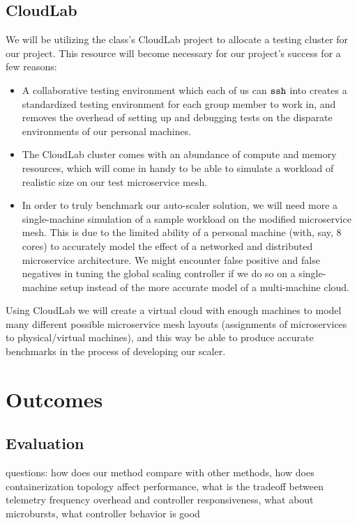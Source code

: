\documentclass{proposal}
\begin{document}
\subsection{CloudLab}
We will be utilizing the class's CloudLab project to allocate a testing cluster for our project. This resource will become necessary for our project's success for a few reasons:
\begin{itemize}
    \item A collaborative testing environment which each of us can $\tt ssh$ into creates a standardized testing environment for each group member to work in, and removes the overhead of setting up and debugging tests on the disparate environments of our personal machines.
    \item The CloudLab cluster comes with an abundance of compute and memory resources, which will come in handy to be able to simulate a workload of realistic size on our test microservice mesh.
    \item In order to truly benchmark our auto-scaler solution, we will need more a single-machine simulation of a sample workload on the modified microservice mesh. This is due to the limited ability of a personal machine (with, say, 8 cores) to accurately model the effect of a networked and distributed microservice architecture. We might encounter false positive and false negatives in tuning the global scaling controller if we do so on a single-machine setup instead of the more accurate model of a multi-machine cloud.
\end{itemize}
Using CloudLab we will create a virtual cloud with enough machines to model many different possible microservice mesh layouts (assignments of microservices to physical/virtual machines), and this way be able to produce accurate benchmarks in the process of developing our scaler.

\section{Outcomes}\label{outcomes}
\subsection{Evaluation}
questions: how does our method compare with other methods, how does containerization topology affect performance, what is the tradeoff between telemetry frequency overhead and controller responsiveness, what about microbursts, what controller behavior is good
\end{document}
